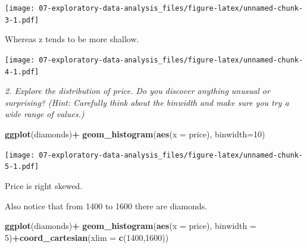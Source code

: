 \documentclass[]{book}
\newenvironment{Shaded}{\begin{snugshade}}{\end{snugshade}}
\newcommand{\DataTypeTok}[1]{\textcolor[rgb]{0.13,0.29,0.53}{#1}}
\newcommand{\DecValTok}[1]{\textcolor[rgb]{0.00,0.00,0.81}{#1}}
\newcommand{\KeywordTok}[1]{\textcolor[rgb]{0.13,0.29,0.53}{\textbf{#1}}}
\newcommand{\NormalTok}[1]{#1}
\newcommand{\OperatorTok}[1]{\textcolor[rgb]{0.81,0.36,0.00}{\textbf{#1}}}
\newcommand{\StringTok}[1]{\textcolor[rgb]{0.31,0.60,0.02}{#1}}
\theoremstyle{definition}
\theoremstyle{definition}
\theoremstyle{definition}
\theoremstyle{remark}
\begin{document}
\texttt{[image: 07-exploratory-data-analysis\_files/figure-latex/unnamed-chunk-3-1.pdf]}

Whereas z tends to be more shallow.

\begin{Shaded}
\end{Shaded}

\texttt{[image: 07-exploratory-data-analysis\_files/figure-latex/unnamed-chunk-4-1.pdf]}

\emph{2. Explore the distribution of price. Do you discover anything
unusual or surprising? (Hint: Carefully think about the binwidth and
make sure you try a wide range of values.)}

\begin{Shaded}
\begin{Highlighting}[]
\KeywordTok{ggplot}\NormalTok{(diamonds)}\OperatorTok{+}
\StringTok{  }\KeywordTok{geom_histogram}\NormalTok{(}\KeywordTok{aes}\NormalTok{(}\DataTypeTok{x =}\NormalTok{ price), }\DataTypeTok{binwidth=}\DecValTok{10}\NormalTok{)}
\end{Highlighting}
\end{Shaded}

\texttt{[image: 07-exploratory-data-analysis\_files/figure-latex/unnamed-chunk-5-1.pdf]}

Price is right skewed.

Also notice that from 1400 to 1600 there are diamonds.

\begin{Shaded}
\begin{Highlighting}[]
\KeywordTok{ggplot}\NormalTok{(diamonds)}\OperatorTok{+}
\StringTok{  }\KeywordTok{geom_histogram}\NormalTok{(}\KeywordTok{aes}\NormalTok{(}\DataTypeTok{x =}\NormalTok{ price), }\DataTypeTok{binwidth =} \DecValTok{5}\NormalTok{)}\OperatorTok{+}\KeywordTok{coord_cartesian}\NormalTok{(}\DataTypeTok{xlim =} \KeywordTok{c}\NormalTok{(}\DecValTok{1400}\NormalTok{,}\DecValTok{1600}\NormalTok{))}
\end{Highlighting}
\end{Shaded}
\end{document}

